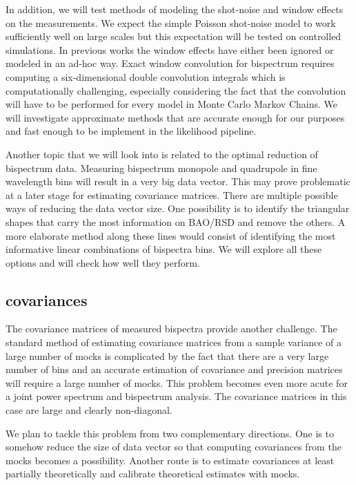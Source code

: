 In addition, we will test methods of modeling the shot-noise and window effects
on the measurements. We expect the simple Poisson shot-noise model to work
sufficiently well on large scales but this expectation will be tested on
controlled simulations. In previous works the window effects have either been
ignored or modeled in an ad-hoc way. Exact window convolution for bispectrum
requires computing a six-dimensional double convolution integrals which is
computationally challenging, especially considering the fact that the
convolution will have to be performed for every model in Monte Carlo Markov
Chains. We will investigate approximate methods that are accurate enough for our
purposes and fast enough to be implement in the likelihood pipeline. 

Another topic that we will look into is related to the optimal reduction of
bispectrum data. Measuring bispectrum monopole and quadrupole in fine
wavelength bins will result in a very big data vector. This may prove
problematic at a later stage for estimating covariance matrices. There are
multiple possible ways of reducing the data vector size. One possibility is to
identify the triangular shapes that carry the most information on BAO/RSD and
remove the others. A more elaborate method along these lines would consist of
identifying the most informative linear combinations of bispectra bins. We will
explore all these options and will check how well they perform.

\subsection*{covariances}

The covariance matrices of measured bispectra provide another challenge. The
standard method of estimating covariance matrices from a sample variance of a
large number of mocks is complicated by the fact that there are a very large
number of bins and an accurate estimation of covariance and precision matrices
will require a large number of mocks. This problem becomes even more acute for
a joint power spectrum and bispectrum analysis. The covariance matrices in this
case are large and clearly non-diagonal.

We plan to tackle this problem from two complementary directions. One is to
somehow reduce the size of data vector so that computing covariances from the
mocks becomes a possibility. Another route is to estimate covariances at least
partially theoretically and calibrate theoretical estimates with mocks. 

